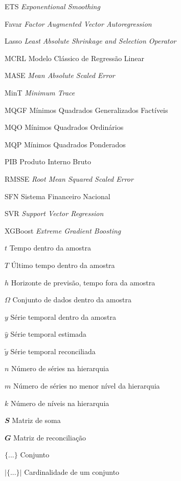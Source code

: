 
\listoftables*
\cleardoublepage

\begin{siglas}
  \item[ETS] \textit{Exponentional Smoothing}
  \item[Favar] \textit{Factor Augmented Vector Autoregression}
  \item[Lasso] \textit{Least Absolute Shrinkage and Selection Operator}
  \item[MCRL] Modelo Clássico de Regressão Linear
  \item[MASE] \textit{Mean Absolute Scaled Error}
  \item[MinT] \textit{Minimum Trace}
  \item[MQGF] Mínimos Quadrados Generalizados Factíveis
  \item[MQO] Mínimos Quadrados Ordinários
  \item[MQP] Mínimos Quadrados Ponderados
  \item[PIB] Produto Interno Bruto
  \item[RMSSE] \textit{Root Mean Squared Scaled Error}
  \item[SFN] Sistema Financeiro Nacional
  \item[SVR] \textit{Support Vector Regression}
  \item[XGBoost] \textit{Extreme Gradient Boosting}
\end{siglas}

\begin{simbolos}
  \item[$ t $] Tempo dentro da amostra
  \item[$ T $] Último tempo dentro da amostra
  \item[$ h $] Horizonte de previsão, tempo fora da amostra
  \item[$ \Omega $] Conjunto de dados dentro da amostra
  \item[$ y $] Série temporal dentro da amostra
  \item[$ \hat{y} $] Série temporal estimada
  \item[$ \tilde{y} $] Série temporal reconciliada
  \item[$ n $] Número de séries na hierarquia
  \item[$ m $] Número de séries no menor nível da hierarquia
  \item[$ k $] Número de níveis na hierarquia
  \item[$ \mathbfit{S} $] Matriz de soma
  \item[$ \mathbfit{G} $] Matriz de reconciliação
  \item[$\{...\}$] Conjunto
  \item[$|\{...\}|$] Cardinalidade de um conjunto
\end{simbolos}

\tableofcontents*
\cleardoublepage

\textual
\pagestyle{simple}